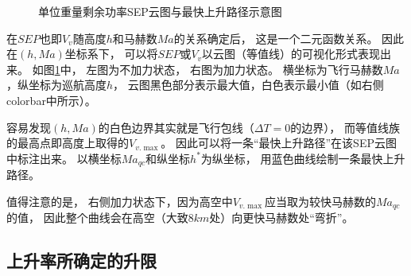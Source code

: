 \begin{figure}[H]
    \centering
    \caption{单位重量剩余功率SEP云图与最快上升路径示意图}
    \label{单位重量剩余功率SEP云图与最快上升路径示意图}
\end{figure}

在$SEP$也即$V_v$随高度$h$和马赫数$Ma$的关系确定后，
这是一个二元函数关系。
因此在$(h,Ma)$坐标系下，
可以将$SEP$或$V_v$以云图（等值线）的可视化形式表现出来。
如图\ref{单位重量剩余功率SEP云图与最快上升路径示意图}中，
左图为不加力状态，
右图为加力状态。
横坐标为飞行马赫数$Ma$，纵坐标为巡航高度$h$，
云图黑色部分表示最大值，白色表示最小值（如右侧colorbar中所示）。

容易发现$(h,Ma)$的白色边界其实就是飞行包线（$\Delta T=0$的边界），
而等值线族的最高点即高度上取得的$V_{v.\max}$。
因此可以将一条“最快上升路径”在该SEP云图中标注出来。
以横坐标$Ma_{qc}$和纵坐标$h^*$为纵坐标，
用蓝色曲线绘制一条最快上升路径。

值得注意的是，
右侧加力状态下，因为高空中$V_{v.\max}$应当取为较快马赫数的$Ma_{qc}$的值，
因此整个曲线会在高空（大致$8km$处）向更快马赫数处“弯折”。


\subsection{上升率所确定的升限}


